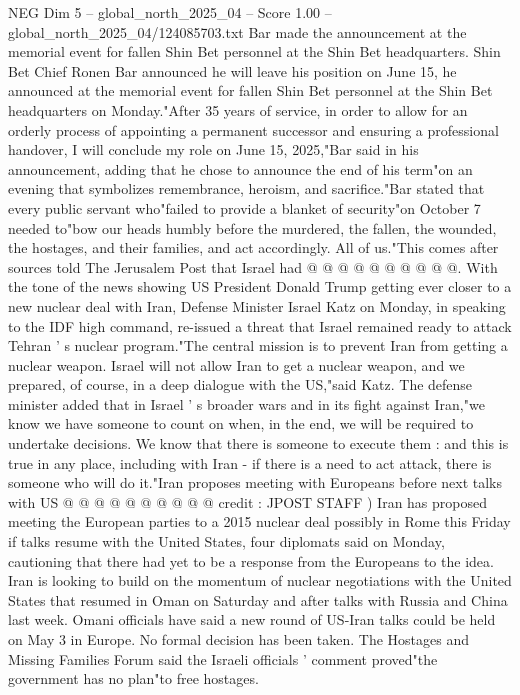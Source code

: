 \begin{textsample}{NEG Dim 5 – global\_north\_2025\_04 – Score 1.00 – global\_north\_2025\_04/124085703.txt}  \label{ex:f5_neg_346}
Bar made the announcement at the memorial event for fallen Shin Bet personnel at the Shin Bet headquarters.
Shin Bet Chief Ronen Bar announced he will leave his position on June 15, he announced at the memorial event for fallen Shin Bet personnel at the Shin Bet headquarters on Monday."After 35 years of service, in order to allow for an orderly process of appointing a permanent successor and ensuring a professional handover, I will conclude my role on June 15, 2025,"Bar said in his announcement, adding that he chose to announce the end of his term"on an evening that symbolizes remembrance, heroism, and sacrifice."Bar stated that every public servant who"failed to provide a blanket of security"on October 7 needed to"bow our heads humbly before the murdered, the fallen, the wounded, the hostages, and their families, and act accordingly.
All of us."This comes after sources told The Jerusalem Post that Israel had @ @ @ @ @ @ @ @ @ @.
With the tone of the news showing US President Donald Trump getting ever closer to a new nuclear deal with Iran, Defense Minister Israel Katz on Monday, in speaking to the IDF high command, re-issued a threat that Israel remained ready to attack Tehran ' s nuclear program."The central mission is to prevent Iran from getting a nuclear weapon.
Israel will not allow Iran to get a nuclear weapon, and we prepared, of course, in a deep dialogue with the US,"said Katz.
The defense minister added that in Israel ' s broader wars and in its fight against Iran,"we know we have someone to count on when, in the end, we will be required to undertake decisions.
We know that there is someone to execute them : and this is true in any place, including with Iran - if there is a need to act attack, there is someone who will do it."Iran proposes meeting with Europeans before next talks with US @ @ @ @ @ @ @ @ @ @ credit : JPOST STAFF ) Iran has proposed meeting the European parties to a 2015 nuclear deal possibly in Rome this Friday if talks resume with the United States, four diplomats said on Monday, cautioning that there had yet to be a response from the Europeans to the idea.
Iran is looking to build on the momentum of nuclear negotiations with the United States that resumed in Oman on Saturday and after talks with Russia and China last week.
Omani officials have said a new round of US-Iran talks could be held on May 3 in Europe.
No formal decision has been taken.
The Hostages and Missing Families Forum said the Israeli officials ' comment proved"the government has no plan"to free hostages.

\end{textsample}

